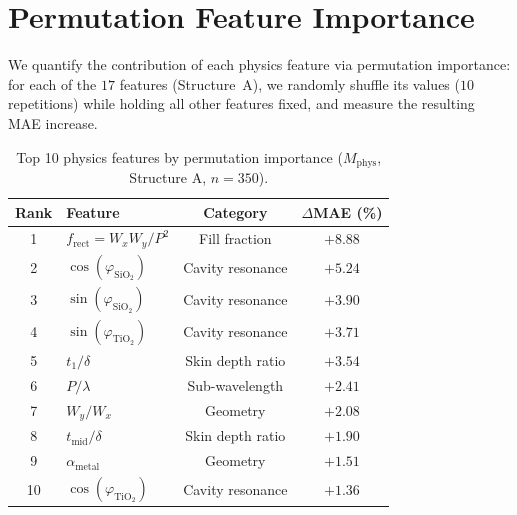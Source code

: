 \documentclass[11pt]{article}
\newcommand{\Mphys}{\ensuremath{M_\text{phys}}}
\begin{document}
\section{Permutation Feature Importance}
\label{sec:si_features}

We quantify the contribution of each physics feature via permutation importance: for each of the $17$ features (Structure~A), we randomly shuffle its values ($10$ repetitions) while holding all other features fixed, and measure the resulting MAE increase.

\begin{table}[htbp]\centering\small
\caption{Top 10 physics features by permutation importance ($\Mphys$, Structure A, $n=350$).}
\label{tab:feature_importance}
\begin{tabular}{clcc}\toprule
\textbf{Rank} & \textbf{Feature} & \textbf{Category} & $\Delta$\textbf{MAE (\%)}\\\midrule
1 & $f_\text{rect} = W_x W_y / P^2$ & Fill fraction & $+8.88$\\
2 & $\cos(\varphi_{\text{SiO}_2})$ & Cavity resonance & $+5.24$\\
3 & $\sin(\varphi_{\text{SiO}_2})$ & Cavity resonance & $+3.90$\\
4 & $\sin(\varphi_{\text{TiO}_2})$ & Cavity resonance & $+3.71$\\
5 & $t_1/\delta$ & Skin depth ratio & $+3.54$\\
6 & $P/\lambda$ & Sub-wavelength & $+2.41$\\
7 & $W_y/W_x$ & Geometry & $+2.08$\\
8 & $t_\text{mid}/\delta$ & Skin depth ratio & $+1.90$\\
9 & $\alpha_\text{metal}$ & Geometry & $+1.51$\\
10 & $\cos(\varphi_{\text{TiO}_2})$ & Cavity resonance & $+1.36$\\\bottomrule
\end{tabular}
\end{table}
\end{document}
